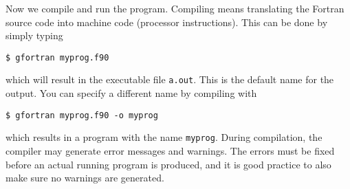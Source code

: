 Now we compile and run the program.
Compiling means translating the Fortran source code into machine code (processor instructions).
This can be done by simply typing
\begin{verbatim}
$ gfortran myprog.f90
\end{verbatim}
which will result in the executable file \texttt{a.out}.
This is the default name for the output.
You can specify a different name by compiling with
\begin{verbatim}
$ gfortran myprog.f90 -o myprog
\end{verbatim}
which results in a program with the name \texttt{myprog}.
During compilation, the compiler may generate error messages and warnings.
The errors must be fixed before an actual running program is produced, and it is good practice to also make sure no warnings are generated.

